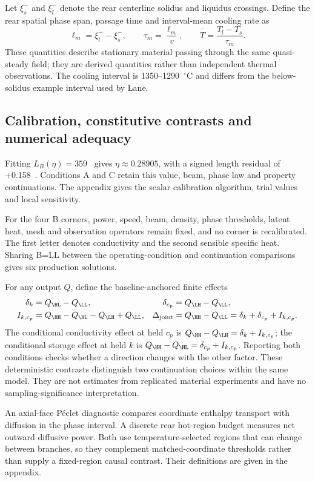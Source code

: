 Let $\xi_s^-$ and $\xi_l^-$ denote the rear centerline solidus and liquidus crossings. Define the rear spatial phase span, passage time and interval-mean cooling rate as
\begin{equation}
 \ell_m=\xi_l^- -\xi_s^-,\qquad
 \tau_m=\frac{\ell_m}{v},\qquad
 \overline{\dot T}=\frac{T_l-T_s}{\tau_m}.
 \label{eq:passage}
\end{equation}
These quantities describe stationary material passing through the same quasi-steady field; they are derived quantities rather than independent thermal observations. The cooling interval is 1350--1290~$^\circ$C and differs from the below-solidus example interval used by Lane.

\subsection{Calibration, constitutive contrasts and numerical adequacy}
Fitting $L_B(\eta)=359$~\um{} gives $\eta\approx0.28905$, with a signed length residual of +0.158~\um. Conditions A and C retain this value, beam, phase law and property continuations. The appendix gives the scalar calibration algorithm, trial values and local sensitivity.

For the four B corners, power, speed, beam, density, phase thresholds, latent heat, mesh and observation operators remain fixed, and no corner is recalibrated. The first letter denotes conductivity and the second sensible specific heat. Sharing B=LL between the operating-condition and continuation comparisons gives six production solutions.

For any output $Q$, define the baseline-anchored finite effects
\begin{align}
 \delta_k&=Q_{\HL}-Q_{\LL}, &
 \delta_{c_p}&=Q_{\LH}-Q_{\LL},\\
 I_{k,c_p}&=Q_{\HH}-Q_{\HL}-Q_{\LH}+Q_{\LL}, &
 \Delta_{\rm joint}&=Q_{\HH}-Q_{\LL}=\delta_k+\delta_{c_p}+I_{k,c_p}.
 \label{eq:contrast}
\end{align}
The conditional conductivity effect at held $c_p$ is $Q_{\HH}-Q_{\LH}=\delta_k+I_{k,c_p}$; the conditional storage effect at held $k$ is $Q_{\HH}-Q_{\HL}=\delta_{c_p}+I_{k,c_p}$. Reporting both conditions checks whether a direction changes with the other factor. These deterministic contrasts distinguish two continuation choices within the same model. They are not estimates from replicated material experiments and have no sampling-significance interpretation.

An axial-face P\'eclet diagnostic compares coordinate enthalpy transport with diffusion in the phase interval. A discrete rear hot-region budget measures net outward diffusive power. Both use temperature-selected regions that can change between branches, so they complement matched-coordinate thresholds rather than supply a fixed-region causal contrast. Their definitions are given in the appendix.

